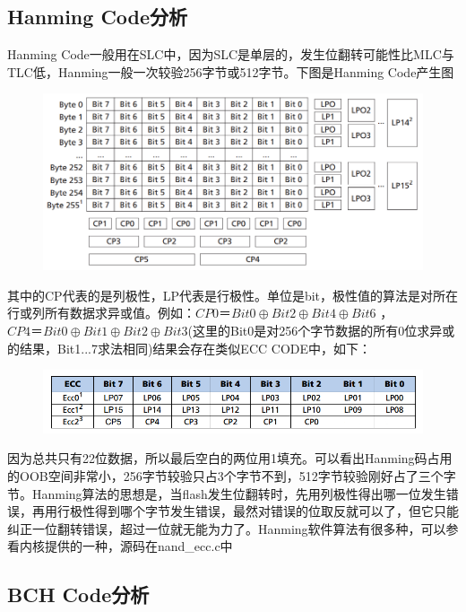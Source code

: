 \subsection{Hanming Code分析}
Hanming Code一般用在SLC中，因为SLC是单层的，发生位翻转可能性比MLC与TLC低，Hanming一般一次较验256字节或512字节。下图是Hanming Code产生图
\begin{figure}[htbp]
\centering
\includegraphics[keepaspectratio,width=\textwidth,height=0.75\textheight]{img/Hanming.png}
\end{figure}

其中的CP代表的是列极性，LP代表是行极性。单位是bit，极性值的算法是对所在行或列所有数据求异或值。例如：$CP0＝Bit0 \oplus Bit2 \oplus Bit4 \oplus Bit6$  ，$CP4＝Bit0 \oplus Bit1 \oplus Bit2 \oplus Bit3$(这里的Bit0是对256个字节数据的所有0位求异或的结果，Bit1...7求法相同)结果会存在类似ECC CODE中，如下：
\begin{figure}[htbp]
\centering
\includegraphics[keepaspectratio,width=\textwidth,height=0.75\textheight]{img/HanmingCode.png}
\end{figure}

因为总共只有22位数据，所以最后空白的两位用1填充。可以看出Hanming码占用的OOB空间非常小，256字节较验只占3个字节不到，512字节较验刚好占了三个字节。Hanming算法的思想是，当flash发生位翻转时，先用列极性得出哪一位发生错误，再用行极性得到哪个字节发生错误，最然对错误的位取反就可以了，但它只能纠正一位翻转错误，超过一位就无能为力了。Hanming软件算法有很多种，可以参看内核提供的一种，源码在nand\_ecc.c中

\subsection{BCH Code分析}















